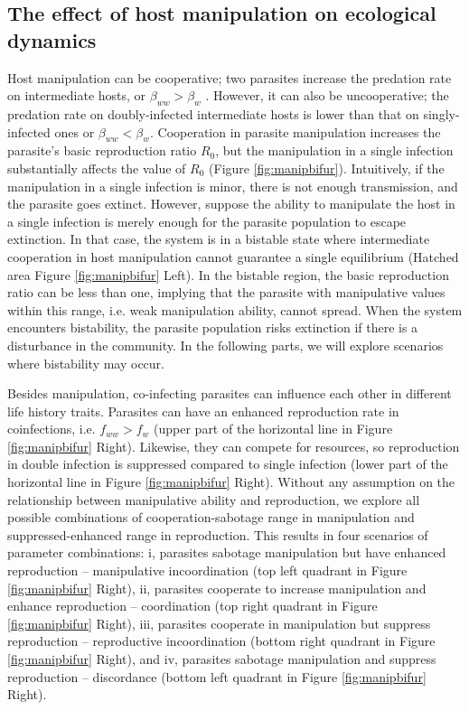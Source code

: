 \documentclass[a4paper]{scrartcl}
\begin{document}
\subsection*{The effect of host manipulation on ecological dynamics}

Host manipulation can be cooperative; two parasites increase the predation rate on intermediate hosts, or $\beta_{ww} > \beta_w$ . 
However, it can also be uncooperative; the predation rate on doubly-infected intermediate hosts is lower than that on singly-infected ones or $\beta_{ww} < \beta_w$.
Cooperation in parasite manipulation increases the parasite's basic reproduction ratio $R_0$, but the manipulation in a single infection substantially affects the value of $R_0$ (Figure \ref{fig:manipbifur}). 
Intuitively, if the manipulation in a single infection is minor, there is not enough transmission, and the parasite goes extinct.
However, suppose the ability to manipulate the host in a single infection is merely enough for the parasite population to escape extinction. 
In that case, the system is in a bistable state where intermediate cooperation in host manipulation cannot guarantee a single equilibrium (Hatched area Figure \ref{fig:manipbifur} Left). 
In the bistable region, the basic reproduction ratio can be less than one, implying that the parasite with manipulative values within this range, i.e. weak manipulation ability, cannot spread. 
When the system encounters bistability, the parasite population risks extinction if there is a disturbance in the community.
In the following parts, we will explore scenarios where bistability may occur. 

Besides manipulation, co-infecting parasites can influence each other in different life history traits.
Parasites can have an enhanced reproduction rate in coinfections, i.e. $f_{ww} > f_w$ (upper part of the horizontal line in Figure \ref{fig:manipbifur} Right). 
Likewise, they can compete for resources, so reproduction in double infection is suppressed compared to single infection (lower part of the horizontal line in Figure \ref{fig:manipbifur} Right). 
Without any assumption on the relationship between manipulative ability and reproduction, we explore all possible combinations of cooperation-sabotage range in manipulation and suppressed-enhanced range in reproduction. This results in four scenarios of parameter combinations: i, parasites sabotage manipulation but have enhanced reproduction -- manipulative incoordination (top left quadrant in Figure \ref{fig:manipbifur} Right), ii, parasites cooperate to increase manipulation and enhance reproduction -- coordination (top right quadrant in Figure \ref{fig:manipbifur} Right), iii, parasites cooperate in manipulation but suppress reproduction -- reproductive incoordination (bottom right quadrant in Figure \ref{fig:manipbifur} Right), and iv, parasites sabotage manipulation and suppress reproduction -- discordance (bottom left quadrant in Figure \ref{fig:manipbifur} Right).
\end{document}
